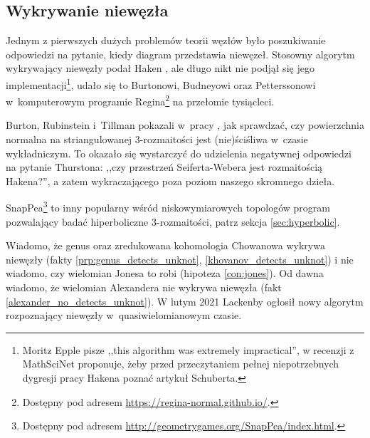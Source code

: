 
\subsection{Wykrywanie niewęzła}
Jednym z pierwszych dużych problemów teorii węzłów było poszukiwanie odpowiedzi na pytanie, kiedy diagram przedstawia niewęzeł.
%
Stosowny algorytm wykrywający niewęzły podał Haken \cite{haken1961}, ale długo nikt nie podjął się jego implementacji\footnote{Moritz Epple pisze ,,this algorithm was extremely impractical'', w recenzji z MathSciNet proponuje, żeby przed przeczytaniem pełnej niepotrzebnych dygresji pracy Hakena poznać artykuł \cite{schubert1961} Schuberta.},  
%
udało się to Burtonowi, Budneyowi oraz Petterssonowi w~komputerowym programie Regina\footnote{Dostępny pod adresem \url{https://regina-normal.github.io/}.} na przełomie tysiącleci.
%
%
%
%

Burton, Rubinstein i~Tillman pokazali w~pracy \cite{burton2012}, jak sprawdzać, czy powierzchnia normalna na striangulowanej 3-rozmaitości jest (nie)ściśliwa w~czasie wykładniczym.
%
%
To okazało się wystarczyć do udzielenia negatywnej odpowiedzi na pytanie Thurstona: ,,czy przestrzeń Seiferta-Webera jest rozmaitością Hakena?'', a zatem wykraczającego poza poziom naszego skromnego dzieła.
%
%
%

SnapPea\footnote{Dostępny pod adresem \url{http://geometrygames.org/SnapPea/index.html}.} to inny popularny wśród niskowymiarowych topologów program pozwalający badać hiperboliczne 3-rozmaitości, patrz sekcja \ref{sec:hyperbolic}.

Wiadomo, że genus oraz zredukowana kohomologia Chowanowa wykrywa niewęzły (fakty \ref{prp:genus_detects_unknot}, \ref{khovanov_detects_unknot}) i nie wiadomo, czy wielomian Jonesa to robi (hipoteza \ref{con:jones}).
%
%
%
Od dawna wiadomo, że wielomian Alexandera nie wykrywa niewęzła (fakt \ref{alexander_no_detects_unknot}).
%
W lutym 2021 Lackenby ogłosił nowy algorytm rozpoznający niewęzły w~quasiwielomianowym czasie.
%

